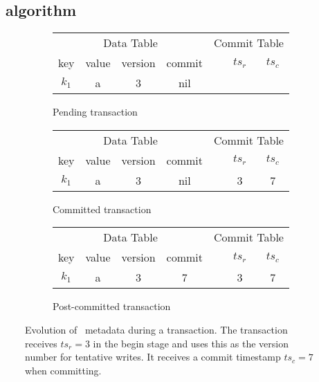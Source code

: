 \subsection{\sysll\ algorithm} 
\label{ssec:ll}

\begin{figure}[!t]
  \centering
  
  \begin{subfigure}[tb]{\columnwidth}
      \centering\small
      
      
      \begin{tabular}{|c|c|c|c| c| c | c|}
\multicolumn{4}{c}{Data Table}&  \multicolumn{3}{r}{\hspace{1mm} Commit Table}\\
\cline{1-4} \cline{6-7}
key & value & version & commit & & $ts_r$ & $ts_c$ \\
\cline{1-4} \cline{6-7}
$k_1$ & a & 3 & nil & &  &  \\
\cline{6-7} \cline{1-4}
\end{tabular}
    
	\caption[]{Pending transaction}
    \label{fig:model:tentative}
  \end{subfigure}
  
  \begin{subfigure}[t]{\columnwidth}
    \centering\small
    
          \begin{tabular}{|c|c|c|c| c| c | c|}
\multicolumn{4}{c}{Data Table}&  \multicolumn{3}{r}{\hspace{1mm} Commit Table}\\
\cline{1-4} \cline{6-7}
key & value & version & commit & & $ts_r$ & $ts_c$ \\
\cline{1-4} \cline{6-7}
$k_1$ & a & 3 & nil & & 3 & 7 \\
\cline{6-7} \cline{1-4}
\end{tabular}
    	\caption[]{Committed transaction}
    \label{fig:model:committed}
  \end{subfigure}


  \begin{subfigure}[tb]{\columnwidth}
    \centering\small
          \begin{tabular}{|c|c|c|c| c| c | c|}
\multicolumn{4}{c}{Data Table}&  \multicolumn{3}{r}{\hspace{1mm} Commit Table}\\
\cline{1-4} \cline{6-7}
key & value & version & commit & & $ts_r$ & $ts_c$ \\
\cline{1-4} \cline{6-7}
$k_1$ & a & 3 & 7& & 3 & 7 \\
\cline{6-7}
\cline{1-4}
\end{tabular}
	\caption[]{Post-committed transaction}
    \label{fig:model:postcommit}
  \end{subfigure}

  
  \caption{Evolution of \sysll\ metadata during a transaction. The transaction receives $ts_r=3$ in the begin stage 
  and uses this as the version number for tentative writes. It receives a commit timestamp $ts_c=7$ when committing.}
  \label{fig:model}
\end{figure}



